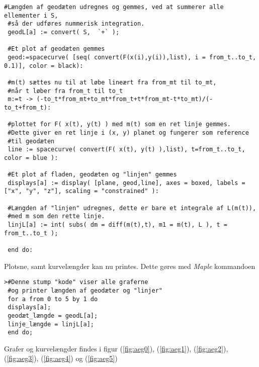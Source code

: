 \begin{lstlisting}[caption={\emph{Maple} kode, der gerere plots af geodæter af typen \ref{eq:aeggegeonem} på en æggebakke}]
 #Længden af geodæten udregnes og gemmes, ved at summerer alle ellementer i S,
 #så der udføres nummerisk integration.
 geodL[a] := convert( S,  `+` );
 
 #Et plot af geodæten gemmes
 geod:=spacecurve( [seq( convert(F(x(i),y(i)),list), i = from_t..to_t, 0.1)], color = black):
 
 #m(t) sættes nu til at løbe lineært fra from_mt til to_mt,
 #når t løber fra from_t til to_t
 m:=t -> (-to_t*from_mt+to_mt*from_t+t*from_mt-t*to_mt)/(-to_t+from_t):
 
 #plottet for F( x(t), y(t) ) med m(t) som en ret linje gemmes.
 #Dette giver en ret linje i (x, y) planet og fungerer som reference
 #til geodæten
 line := spacecurve( convert(F( x(t), y(t) ),list), t=from_t..to_t, color = blue ):
 
 #Et plot af fladen, geodæten og "linjen" gemmes
 displays[a] := display( [plane, geod,line], axes = boxed, labels = ["x", "y", "z"], scaling = "constrained" ):
 
 #Længden af "linjen" udregnes, dette er bare et integrale af L(m(t)),
 #med m som den rette linje.
 linjL[a] := int( subs( dm = diff(m(t),t), m1 = m(t), L ), t = from_t..to_t );
 
 end do:
\end{lstlisting}



Plotsne, samt kurvelængder kan nu printes. Dette gøres med \emph{Maple} kommandoen
 
 \begin{lstlisting}[caption={\emph{Maple} kode, der tegner genererede plots af geodæter af typen \ref(eq:aeggegeonem) på en æggebakke}]
>#Denne stump "kode" viser alle graferne
 #og printer længden af geodæter og "linjer"
 for a from 0 to 5 by 1 do
 displays[a];
 geodæt_længde = geodL[a];
 linje_længde = linjL[a];
 end do;
 \end{lstlisting}
 
 Grafer og kurvelængder findes i figur (\ref{fig:aeg0}), (\ref{fig:aeg1}), (\ref{fig:aeg2}),
 (\ref{fig:aeg3}), (\ref{fig:aeg4}) og (\ref{fig:aeg5})
 
